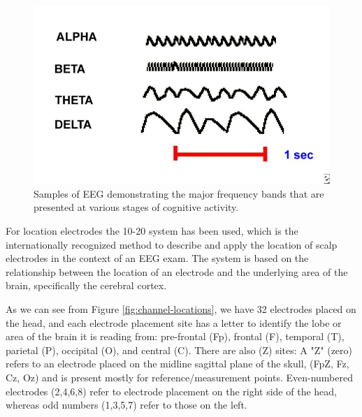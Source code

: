 \documentclass[12pt,a4paper,titlepage,openany]{report}
\begin{document}
\begin{figure}[H]
     \centering
     \includegraphics[width=1\linewidth]{./misc/waves.png}
     \caption{Samples of EEG demonstrating the major frequency bands that are presented at various stages of cognitive activity\cite{khalifa2012}.}
     \label{fig:brain-waves}
\end{figure}

For location electrodes the 10-20 system \cite{wikipedia1020} has been used, which is the internationally recognized method to describe and apply the location of scalp electrodes in the context of an EEG exam. The system is based on the relationship between the location of an electrode and the underlying area of the brain, specifically the cerebral cortex.

As we can see from Figure \ref{fig:channel-locations}, we have 32 electrodes placed on the head, and each electrode placement site has a letter to identify the lobe or area of the brain it is reading from: pre-frontal (Fp), frontal (F), temporal (T), parietal (P), occipital (O), and central (C). There are also (Z) sites: A "Z" (zero) refers to an electrode placed on the midline sagittal plane of the skull, (FpZ, Fz, Cz, Oz) and is present mostly for reference/measurement points. Even-numbered electrodes (2,4,6,8) refer to electrode placement on the right side of the head, whereas odd numbers (1,3,5,7) refer to those on the left.
\end{document}
